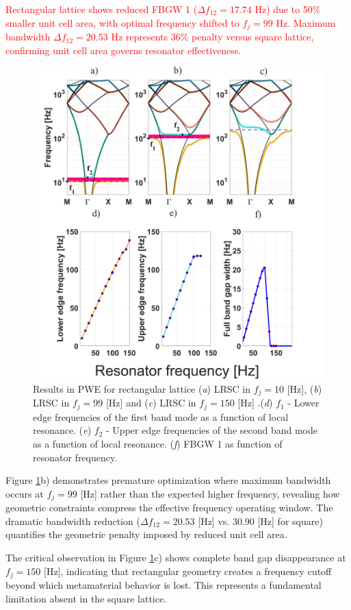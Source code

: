 \documentclass[review,numbers,sort&compress]{elsarticle}
\begin{document}
\textcolor{red}{Rectangular lattice shows reduced FBGW 1 ($\Delta f_{12} = 17.74$ Hz) due to 50\% smaller unit cell area, with optimal frequency shifted to $f_j = 99$ Hz. Maximum bandwidth $\Delta f_{12} = 20.53$ Hz represents 36\% penalty versus square lattice, confirming unit cell area governs resonator effectiveness.}
\newpage
\begin{figure}[htb]
	\centering
	\includegraphics[width=.8\textwidth]{2_2_disp_frf_rect.pdf}
	\caption{Results in PWE for rectangular lattice (\textit{a}) LRSC in $f_j=10$ [Hz], (\textit{b}) LRSC in $f_j=99$ [Hz] and (\textit{c}) LRSC in $f_j=150$ [Hz] .(\textit{d}) $f_1$ -  Lower edge frequencies of the first band mode as a function of local resonance. (\textit{e}) $f_2$ -  Upper edge frequencies of the second band mode as a function of local resonance. (\textit{f}) FBGW 1 as function of resonator frequency.}
	\label{pwe_disp_rect_all_res}
\end{figure}
Figure \ref{pwe_disp_rect_all_res}b) demonstrates premature optimization where maximum bandwidth occurs at $f_j = 99$ [Hz] rather than the expected higher frequency, revealing how geometric constraints compress the effective frequency operating window. The dramatic bandwidth reduction ($\Delta f_{12} = 20.53$ [Hz] vs. $30.90$ [Hz] for square) quantifies the geometric penalty imposed by reduced unit cell area.

The critical observation in Figure \ref{pwe_disp_rect_all_res}c) shows complete band gap disappearance at $f_j = 150$ [Hz], indicating that rectangular geometry creates a frequency cutoff beyond which metamaterial behavior is lost. This represents a fundamental limitation absent in the square lattice.
\end{document}
